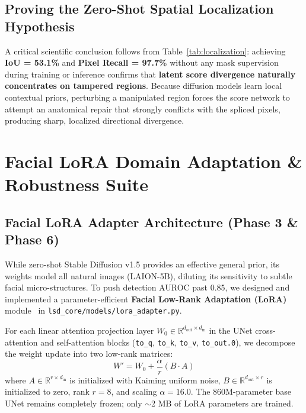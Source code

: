 \documentclass[12pt,a4paper]{report}
\begin{document}
\section{Proving the Zero-Shot Spatial Localization Hypothesis}
A critical scientific conclusion follows from Table~\ref{tab:localization}: achieving \textbf{IoU = 53.1\%} and \textbf{Pixel Recall = 97.7\%} without any mask supervision during training or inference confirms that \textbf{latent score divergence naturally concentrates on tampered regions}. Because diffusion models learn local contextual priors, perturbing a manipulated region forces the score network to attempt an anatomical repair that strongly conflicts with the spliced pixels, producing sharp, localized directional divergence.

\clearpage

\chapter{Facial LoRA Domain Adaptation \& Robustness Suite}

\section{Facial LoRA Adapter Architecture (Phase 3 \& Phase 6)}
While zero-shot Stable Diffusion v1.5 provides an effective general prior, its weights model all natural images (LAION-5B), diluting its sensitivity to subtle facial micro-structures. To push detection AUROC past 0.85, we designed and implemented a parameter-efficient \textbf{Facial Low-Rank Adaptation (LoRA)} module~\cite{hu2022lora} in \texttt{lsd\_core/models/lora\_adapter.py}.

For each linear attention projection layer $W_0 \in \mathbb{R}^{d_{\text{out}} \times d_{\text{in}}}$ in the UNet cross-attention and self-attention blocks (\texttt{to\_q}, \texttt{to\_k}, \texttt{to\_v}, \texttt{to\_out.0}), we decompose the weight update into two low-rank matrices:
\begin{equation}
    W' = W_0 + \frac{\alpha}{r} (B \cdot A)
\end{equation}
where $A \in \mathbb{R}^{r \times d_{\text{in}}}$ is initialized with Kaiming uniform noise, $B \in \mathbb{R}^{d_{\text{out}} \times r}$ is initialized to zero, rank $r = 8$, and scaling $\alpha = 16.0$. The 860M-parameter base UNet remains completely frozen; only $\sim$2 MB of LoRA parameters are trained.
\end{document}
